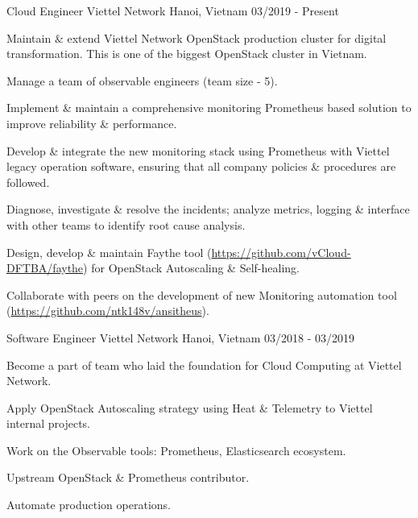 

\begin{cventries}

  \cventry
    {Cloud Engineer} %
    {Viettel Network} %
    {Hanoi, Vietnam} %
    {03/2019 - Present} %
    {
      \begin{cvitems} %
        \item {Maintain \& extend Viettel Network OpenStack production cluster for digital transformation. This is one of the biggest OpenStack cluster in Vietnam.}
        \item {Manage a team of observable engineers (team size - 5).}
        \item {Implement \& maintain a comprehensive monitoring Prometheus based solution to improve reliability \& performance.}
        \item {Develop \& integrate the new monitoring stack using Prometheus with Viettel legacy operation software, ensuring that all company policies \& procedures are followed.}
        \item {Diagnose, investigate \& resolve the incidents; analyze metrics, logging \& interface with other teams to identify root cause analysis.}
        \item {Design, develop \& maintain Faythe tool (\url{https://github.com/vCloud-DFTBA/faythe}) for OpenStack Autoscaling \& Self-healing.}
        \item {Collaborate with peers on the development of new Monitoring automation tool (\url{https://github.com/ntk148v/ansitheus}).}
      \end{cvitems}
    }

  \cventry
    {Software Engineer} %
    {Viettel Network} %
    {Hanoi, Vietnam} %
    {03/2018 - 03/2019} %
    {
      \begin{cvitems} %
        \item {Become a part of team who laid the foundation for Cloud Computing at Viettel Network.}
        \item {Apply OpenStack Autoscaling strategy using Heat \& Telemetry to Viettel internal projects.}
        \item {Work on the Observable tools: Prometheus, Elasticsearch ecosystem.}
        \item {Upstream OpenStack \& Prometheus contributor.}
        \item {Automate production operations.}
      \end{cvitems}
    }


\end{cventries}

